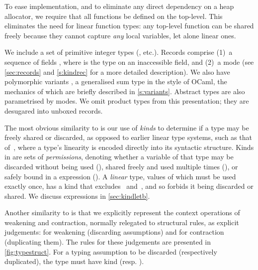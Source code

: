 \documentclass[9pt\ifFinal\else,preprint,nocopyrightspace\fi,\ifAlpha\else natbib,authoryear\fi]{sigplanconf}
\begin{document}
To ease implementation, and to eliminate any direct dependency on a heap allocator, we require that all functions be defined on the top-level. 
This eliminates the need for linear function types: any top-level function can be shared freely because they cannot capture \emph{any} local variables, 
let alone linear ones.

We include a set of primitive integer types (, 
etc.). Records  comprise
(1)~a sequence of fields , where  is the type on
an inaccessible field, and (2)~a mode  (see
 \mbox{\autoref{sec:records}} and \autoref{s:kindrec} for a more detailed description). We also have polymorphic variants
, a generalised sum type in the style of
OCaml, the mechanics of which are briefly described in
\autoref{s:variants}. Abstract types  are also
parametrised by modes.
We omit product types from this presentation; they are desugared into unboxed records.

The most obvious similarity to  is our use of \emph{kinds} to determine if a type may be freely shared or discarded, as 
opposed to earlier linear type systems, such as that of~\citet{Wadler_90}, where a type's linearity is encoded directly into its syntactic structure. Kinds 
in \CDSL are sets of \emph{permissions}, denoting whether a variable of that type may be discarded without being used (), shared freely and used 
multiple times (), or safely bound in a  expression (). A \emph{linear} type, values of which must be used exactly once, 
has a kind
that excludes~ and~, and so forbids it being discarded or shared.
We discuss  expressions in \autoref{sec:kindletb}. 

Another similarity to  is that we explicitly represent the context operations of weakening and contraction, normally relegated to structural rules, 
as explicit judgements:  for weakening (discarding assumptions) and  for contraction (duplicating them). 
The rules for these judgements are presented in \autoref{fig:typestruct}. For a typing assumption to be discarded (respectively duplicated),
the type must have kind  (resp. ).
\end{document}
